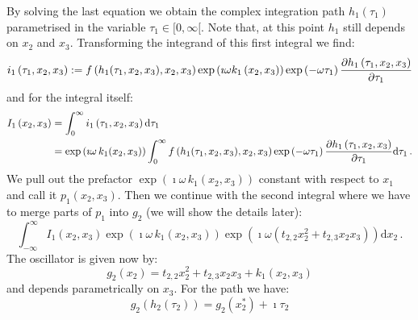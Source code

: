 \documentclass[a4paper,10pt]{article}
\begin{document}
By solving the last equation we obtain the complex integration path
$h_1\left(\tau_1\right)$ parametrised in the variable $\tau_1 \in [0,\infty[$.
Note that, at this point $h_1$ still depends on $x_2$ and $x_3$.
Transforming the integrand of this first integral we find:
\begin{equation*}
 i_1\left(\tau_1, x_2, x_3\right) := f\left(h_1(\tau_1, x_2, x_3), x_2, x_3\right)
                                     \exp\left(\imath \omega k_1\left(x_2, x_3\right) \right)
                                     \exp\left(- \omega \tau_1 \right)
                                     \frac{\partial h_1\left(\tau_1, x_2, x_3\right)}{\partial \tau_1}
\end{equation*}
and for the integral itself:
\begin{equation*}
\begin{split}
  I_1\left(x_2, x_3\right) & = \int_0^{\infty} i_1\left(\tau_1, x_2, x_3\right) \mathrm{d}\tau_1 \\
                           & = \exp\left(\imath \omega \,k_1\!\left(x_2, x_3\right) \right)
                               \int_0^{\infty} f\left(h_1(\tau_1, x_2, x_3), x_2, x_3\right)
                                               \exp\left(- \omega \tau_1 \right)
                                               \frac{\partial h_1\left(\tau_1, x_2, x_3\right)}{\partial \tau_1}
                               \mathrm{d}\tau_1 \,.
\end{split}
\end{equation*}
We pull out the prefactor $\exp\left(\imath \omega \,k_1\!\left(x_2, x_3\right) \right)$
constant with respect to $x_1$ and call it $p_1\left(x_2, x_3\right)$.
Then we continue with the second integral where we have to merge parts of
$p_1$ into $g_2$ (we will show the details later):
\begin{equation}
  \int_{-\infty}^{\infty} I_1\left(x_2, x_3\right)
                          \exp\left(\imath \omega \,k_1\!\left(x_2, x_3\right) \right)
                          \exp\left(\imath \omega \left(t_{2,2} x_2^2 + t_{2,3} x_2 x_3\right) \right)
  \mathrm{d}x_2 \,.
\end{equation}
The oscillator is given now by:
\begin{equation}
 g_2(x_2) = t_{2,2} x_2^2 + t_{2,3} x_2 x_3 + k_1(x_2, x_3)
\end{equation}
and depends parametrically on $x_3$. For the path we have:
\begin{equation}
  g_2\left(h_2(\tau_2)\right) = g_2\left(x_2^{*}\right) + \imath \tau_2
\end{equation}
\end{document}
